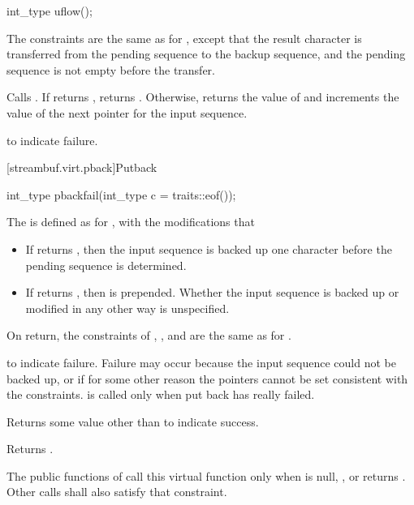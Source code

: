 %
\begin{itemdecl}
int_type uflow();
\end{itemdecl}

\begin{itemdescr}
\pnum
\expects
The constraints are the same as for
,
except that the result character is transferred from the pending
sequence to the backup sequence, and the pending sequence is not empty before the transfer.

\pnum
{}
Calls
.
If
returns
,
returns
.
Otherwise, returns the value of
and increments the value of the next pointer for the input sequence.

\pnum
\returns
{}
to indicate failure.
\end{itemdescr}

[streambuf.virt.pback]{Putback}

%
\begin{itemdecl}
int_type pbackfail(int_type c = traits::eof());
\end{itemdecl}

\begin{itemdescr}
\pnum
The
is defined as for
,
with the modifications that
\begin{itemize}
\item
If
returns
,
then the input sequence is backed up one character before the pending sequence is determined.
\item
If
returns , then  is prepended.
Whether the input sequence is backed up or modified in any other way is unspecified.
\end{itemize}

\pnum
\ensures
On return, the constraints of
,
,
and
are the same as for
.

\pnum
\returns
{}
to indicate failure.
Failure may occur because the input sequence could not be backed up, or if for some
other reason the pointers cannot be set consistent with the constraints.
is called only when put back has really failed.

\pnum
Returns some value other than
to indicate success.

\pnum
{}
Returns
.

\pnum
\remarks
The public functions of
call this virtual function only when
is null,
,
or
returns
.
Other calls shall also satisfy that constraint.
\end{itemdescr}

